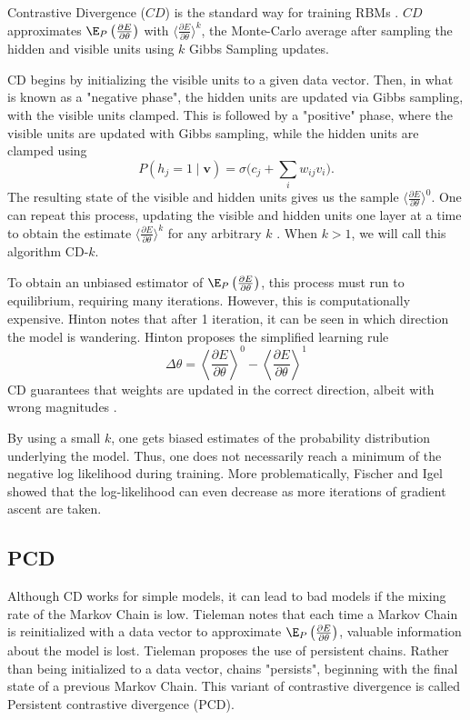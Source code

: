 Contrastive Divergence ($CD$) is the standard way for training RBMs \cite{hinton2002training}.  $CD$ approximates $\E_P\left(\frac{\partial E}{\partial \theta}\right)$ with $\langle \frac{\partial E}{\partial \theta}\rangle^k$, the Monte-Carlo average after sampling the hidden and visible units using $k$ Gibbs Sampling updates. 

CD begins by initializing the visible units to a given data vector. Then, in what is known as a "negative phase", the hidden units are updated via Gibbs sampling, with the visible units clamped. This is followed by a "positive" phase, where the visible units are updated with Gibbs sampling, while the hidden units are clamped using
\[P(h_j = 1 \mid \mathbf{v}) = \sigma\Big( c_j + \textstyle{\sum_i} w_{ij}v_i \Big).\] 
The resulting state of the visible and hidden units gives us the sample $\langle \frac{\partial E}{\partial \theta} \rangle ^0$. One can repeat this process, updating the visible and hidden units one layer at a time to obtain the estimate $\langle \frac{\partial E}{\partial \theta}\rangle ^k$ for any arbitrary $k$ \cite{hinton2012practical}. When $k>1$, we will call this algorithm CD-$k$.

To obtain an unbiased estimator of $\E_P\left(\frac{\partial E}{\partial \theta}\right)$, this process must run to equilibrium, requiring many iterations. However, this is computationally expensive. Hinton \cite{hinton2002training} notes that after 1 iteration, it can be seen in which direction the model is wandering. Hinton proposes the simplified learning rule
\[\Delta \theta = \left\langle\frac{\partial E}{\partial \theta} \right\rangle^0 - \left\langle \frac{\partial E}{\partial \theta}\right \rangle^1\]
CD guarantees that weights are updated in the correct direction, albeit with wrong magnitudes \cite{tieleman2008training}. 

By using a small $k$, one gets biased estimates of the probability distribution underlying the model. Thus, one does not necessarily reach a minimum of the negative log likelihood during training. More problematically, Fischer and Igel \cite{fischer2010empirical} showed that the log-likelihood can even decrease as more iterations of gradient ascent are taken.


\subsection{PCD}

Although CD works for simple models, it can lead to bad models if the mixing rate of the Markov Chain is low. Tieleman \cite{tieleman2008training} notes that each time a Markov Chain is reinitialized with a data vector to approximate $\E_P\left(\frac{\partial E}{\partial \theta}\right)$, valuable information about the model is lost. Tieleman proposes the use of persistent chains. Rather than being initialized to a data vector, chains "persists", beginning with the final state of a previous Markov Chain. This variant of contrastive divergence is called Persistent contrastive divergence (PCD).

